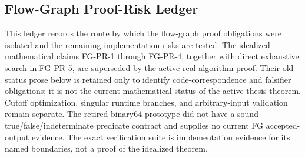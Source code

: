%
%
%
%


\subsection{Flow-Graph Proof-Risk Ledger}
\label{sec:flow-graph-proof-risk}

This ledger records the route by which the flow-graph proof obligations were
isolated and the remaining implementation risks are tested.  The idealized
mathematical claims FG-PR-1 through FG-PR-4, together with direct exhaustive
search in FG-PR-5, are superseded by the active real-algorithm proof. Their old
status prose below is retained only to identify code-correspondence and falsifier
obligations; it is not the current mathematical status of the active thesis
theorem. Cutoff optimization, singular runtime branches, and arbitrary-input
validation remain separate. The retired binary64 prototype did not have a
sound true/false/indeterminate predicate contract and supplies no current FG
accepted-output evidence. The exact verification suite is implementation
evidence for its named boundaries, not a proof of the idealized theorem.


